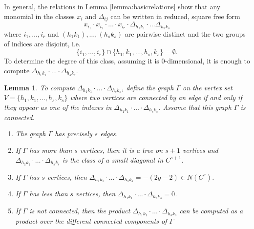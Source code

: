\documentclass[12pt]{article}
\newtheorem{lemma}[theorem]{Lemma}
\numberwithin{equation}{section}
\theoremstyle{definition}
\begin{document}
In general, the relations in Lemma \ref{lemma:basicrelations} show that any monomial in the classes $x_i$ and $\Delta_{ij}$ can be written in reduced, square free form
\begin{equation}\label{eq:monomialform} 
x_{i_1}\cdot x_{i_2} \cdot \dots \cdot x_{i_r} \cdot \Delta_{h_1k_1} \cdot \dots \Delta_{h_sk_s} 
\end{equation}
where $i_1,\dots,i_r$ and $(h_1k_1),\dots,(h_sk_s)$ are pairwise distinct and the two groups of indices are disjoint, i.e.~
\[ \{ i_1,\dots,i_r \} \cap \{ h_1,k_1,\dotsc,h_s,k_s \} = \emptyset. \]
To determine the degree of this class, assuming it is $0$-dimensional, it is enough to compute $\Delta_{h_1k_1} \cdot \dotsc \cdot \Delta_{h_sk_s}$. 
\begin{lemma}\label{lemma:graphrelation}
	To compute $\Delta_{h_1k_1} \cdot \dotsc \cdot \Delta_{h_sk_s}$, define the graph $\Gamma$ on the vertex set $V=\{h_1,k_1,\dots,h_s,k_s \}$ where two vertices are connected by an edge if and only if they appear as one of the indexes in $\Delta_{h_1k_1} \cdot \dotsc \cdot\Delta_{h_sk_s}$. 
	Assume that this graph $\Gamma$ is connected.
	\begin{enumerate}[label=(\arabic*)]
		\item The graph $\Gamma$ has precisely $s$ edges.
		\item If $\Gamma$ has more than $s$ vertices, then it is a tree on $s+1$ vertices and $\Delta_{h_1k_1}\cdot \dotsc \cdot \Delta_{h_sk_s}$ is the class of a small diagonal in $C^{s+1}$.
		\item If $\Gamma$ has $s$ vertices, then $\Delta_{h_1k_1}\cdot \dotsc \cdot \Delta_{h_sk_s} = -(2g-2) \in N(C^s)$.
		\item If $\Gamma$ has less than $s$ vertices, then $\Delta_{h_1k_1}\cdot \dotsc \cdot \Delta_{h_sk_s} = 0$.
		\item If $\Gamma$ is not connected, then the product $\Delta_{h_1k_1} \cdot \dotsc \cdot \Delta_{h_sk_s}$ can be computed as a product over the different connected components of $\Gamma$
	\end{enumerate}
    
\end{lemma}
\end{document}
